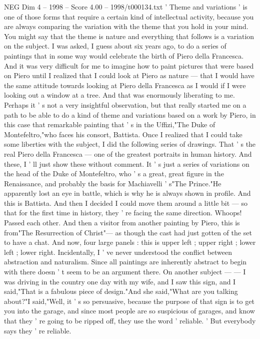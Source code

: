 \begin{textsample}{NEG Dim 4 – 1998 – Score 4.00 – 1998/t000134.txt}  \label{ex:f4_neg_070}
' Theme and variations ' is one of those forms that require a certain kind of intellectual activity, because you are always comparing the variation with the theme that you hold in your mind.
You might say that the theme is nature and everything that follows is a variation on the subject.
I was asked, I guess about six years ago, to do a series of paintings that in some way would celebrate the birth of Piero della Francesca.
And it was very difficult for me to imagine how to paint pictures that were based on Piero until I realized that I could look at Piero as nature — that I would have the same attitude towards looking at Piero della Francesca as I would if I were looking out a window at a tree.
And that was enormously liberating to me.
Perhaps it ' s not a very insightful observation, but that really started me on a path to be able to do a kind of theme and variations based on a work by Piero, in this case that remarkable painting that ' s in the Uffizi,"The Duke of Montefeltro,"who faces his consort, Battista.
Once I realized that I could take some liberties with the subject, I did the following series of drawings.
That ' s the real Piero della Francesca — one of the greatest portraits in human history.
And these, I ' ll just show these without comment.
It ' s just a series of variations on the head of the Duke of Montefeltro, who ' s a great, great figure in the Renaissance, and probably the basis for Machiavelli ' s"The Prince."He apparently lost an eye in battle, which is why he is always shown in profile.
And this is Battista.
And then I decided I could move them around a little bit — so that for the first time in history, they ' re facing the same direction.
Whoops!
Passed each other.
And then a visitor from another painting by Piero, this is from"The Resurrection of Christ"— as though the cast had just gotten of the set to have a chat.
And now, four large panels : this is upper left ; upper right ; lower left ; lower right.
Incidentally, I ' ve never understood the conflict between abstraction and naturalism.
Since all paintings are inherently abstract to begin with there doesn ' t seem to be an argument there.
On another subject — — I was driving in the country one day with my wife, and I saw this sign, and I said,"That is a fabulous piece of design."And she said,"What are you talking about?"I said,"Well, it ' s so persuasive, because the purpose of that sign is to get you into the garage, and since most people are so suspicious of garages, and know that they ' re going to be ripped off, they use the word ' reliable. ' But everybody says they ' re reliable.

\end{textsample}
